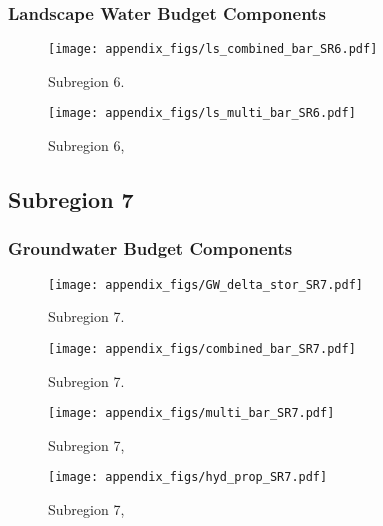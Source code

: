 \subsubsection{Landscape Water Budget Components}
\begin{figure}[ht]
\centerline{\texttt{[image: appendix\_figs/ls\_combined\_bar\_SR6.pdf]}}
\caption{\LSCombinedTextOne Subregion 6.\LSCombinedTextTwo}
\label{fig:LS_budget_SR6}
\end{figure}
\newpage

\begin{landscape}
\begin{figure}[ht]
\centerline{\texttt{[image: appendix\_figs/ls\_multi\_bar\_SR6.pdf]}}
\caption{\LSMultiTextOne Subregion 6,\LSMultiTextTwo}
\label{fig:multi_LS_budget_SR6}
\end{figure}
\newpage
\end{landscape}

\subsection{Subregion 7}
\subsubsection{Groundwater Budget Components}
\begin{figure}[h]
\centerline{\texttt{[image: appendix\_figs/GW\_delta\_stor\_SR7.pdf]}}
\caption{\GWBudgetText Subregion 7.}
\label{fig:delta_stor_SR7}
\end{figure}
\newpage

\begin{figure}[ht]
\centerline{\texttt{[image: appendix\_figs/combined\_bar\_SR7.pdf]}}
\caption{\GWCombinedTextOne Subregion 7.\GWCombinedTextTwo}
\label{fig:GW_budget_SR7}
\end{figure}
\newpage

\begin{landscape}
\begin{figure}[ht]
\centerline{\texttt{[image: appendix\_figs/multi\_bar\_SR7.pdf]}}
\caption{\GWMultiTextOne Subregion 7,\GWMultiTextTwo}
\label{fig:multi_GW_budget_SR7}
\end{figure}
\newpage

\begin{figure}[ht]
\centerline{\texttt{[image: appendix\_figs/hyd\_prop\_SR7.pdf]}}
\caption{\HydPropOne Subregion 7,\HydPropTwo}
\label{fig:hyd_prop_SR7}
\end{figure}
\newpage
\end{landscape}

